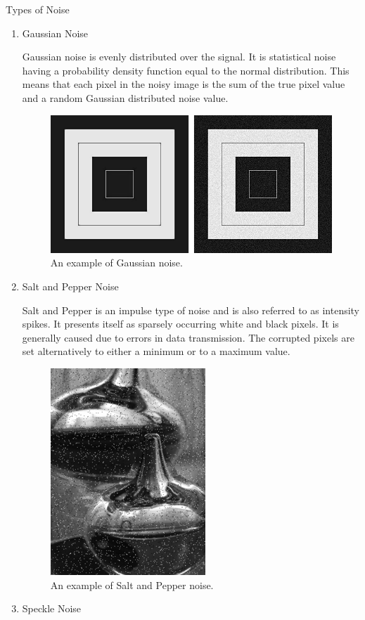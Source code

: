 \documentclass[paper=a4, fontsize=11pt]{scrartcl} %
\numberwithin{equation}{section} %
\numberwithin{figure}{section} %
\numberwithin{table}{section} %
\begin{document}
Types of Noise
\begin{enumerate}
\item Gaussian Noise
  
  Gaussian noise is evenly distributed over the signal. It is statistical noise having a probability density function equal to the normal distribution. This means that each pixel in the noisy image is the sum of the true pixel value and a random Gaussian distributed noise value.
  \begin{figure}[H]
	\centering
	\includegraphics[scale=0.5]{"gaussian"}
        \caption{An example of Gaussian noise.}
        \label{gaussian}
  \end{figure}
\item Salt and Pepper Noise
  
  Salt and Pepper is an impulse type of noise and is also referred to as intensity spikes. It presents itself as sparsely occurring white and black pixels. It is generally caused due to errors in data transmission. The corrupted pixels are set alternatively to either a minimum or to a maximum value.
  \begin{figure}[H]
	\centering
	\includegraphics[scale=0.5]{"salt and pepper"}
        \caption{An example of Salt and Pepper noise.}
        \label{salt}
\end{figure}
\item Speckle Noise
  

\end{enumerate}
\end{document}
